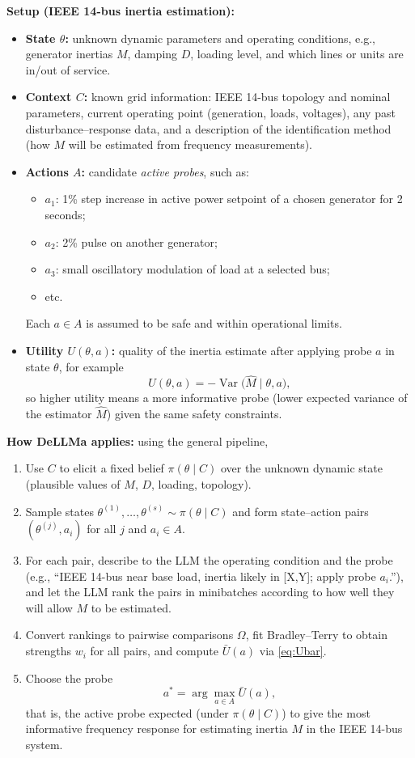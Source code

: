 \documentclass[11pt]{article}
\begin{document}
\textbf{Setup (IEEE 14-bus inertia estimation):}
\begin{itemize}[leftmargin=*]
\item \textbf{State $\theta$:} unknown dynamic parameters and operating conditions, e.g., generator inertias $M$, damping $D$, loading level, and which lines or units are in/out of service.
\item \textbf{Context $C$:} known grid information: IEEE 14-bus topology and nominal parameters, current operating point (generation, loads, voltages), any past disturbance--response data, and a description of the identification method (how $M$ will be estimated from frequency measurements).
\item \textbf{Actions $A$:} candidate \emph{active probes}, such as:
  \begin{itemize}
  \item $a_1$: 1\% step increase in active power setpoint of a chosen generator for 2 seconds;
  \item $a_2$: 2\% pulse on another generator;
  \item $a_3$: small oscillatory modulation of load at a selected bus;
  \item etc.
  \end{itemize}
  Each $a \in A$ is assumed to be safe and within operational limits.
\item \textbf{Utility $U(\theta,a)$:} quality of the inertia estimate after applying probe $a$ in state $\theta$, for example
\[
U(\theta,a) = - \operatorname{Var}\bigl(\widehat{M} \mid \theta, a\bigr),
\]
so higher utility means a more informative probe (lower expected variance of the estimator $\widehat{M}$) given the same safety constraints.
\end{itemize}

\textbf{How DeLLMa applies:} using the general pipeline,
\begin{enumerate}[leftmargin=*]
\item Use $C$ to elicit a fixed belief $\pi(\theta\mid C)$ over the unknown dynamic state (plausible values of $M$, $D$, loading, topology).
\item Sample states $\theta^{(1)},\ldots,\theta^{(s)} \sim \pi(\theta\mid C)$ and form state--action pairs $(\theta^{(j)},a_i)$ for all $j$ and $a_i \in A$.
\item For each pair, describe to the LLM the operating condition and the probe (e.g., ``IEEE 14-bus near base load, inertia likely in [X,Y]; apply probe $a_i$.''), and let the LLM rank the pairs in minibatches according to how well they will allow $M$ to be estimated.
\item Convert rankings to pairwise comparisons $\Omega$, fit Bradley--Terry to obtain strengths $w_i$ for all pairs, and compute $\bar{U}(a)$ via \eqref{eq:Ubar}.
\item Choose the probe
\[
a^* = \arg\max_{a \in A} \bar{U}(a),
\]
that is, the active probe expected (under $\pi(\theta\mid C)$) to give the most informative frequency response for estimating inertia $M$ in the IEEE 14-bus system.
\end{enumerate}
\end{document}
